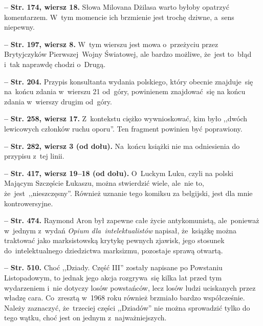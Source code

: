 \documentclass[a4paper,11pt]{article}  %
\newcommand{\spaceFour}{0.5em}
\newcommand{\tb}{\textbf}
\newcommand{\noi}{\noindent}
\newcommand{\start}{\noi \tb{--} {}}
\newcommand{\Str}[1]{\tb{Str. #1.}}
\newcommand{\StrWg}[2]{\tb{Str. #1, wiersz #2.}}
\newcommand{\StrWd}[2]{\tb{Str. #1, wiersz #2 (od dołu).}}
\begin{document}
\vspace{\spaceFour}


\start \StrWg{174}{18} Słowa Milovana Dżilasa warto byłoby opatrzyć
komentarzem. W~tym momencie ich brzmienie jest trochę dziwne, a~sens
niepewny.

\vspace{\spaceFour}


\start \StrWg{197}{8} W~tym wierszu jest mowa o~przeżyciu przez
Brytyjczyków Pierwszej~Wojny Światowej, ale bardzo możliwe, że~jest
to~błąd i~tak naprawdę chodzi o~Drugą.

\vspace{\spaceFour}


\start \Str{204} Przypis konsultanta wydania polskiego, który obecnie
znajduje~się na~końcu zdania w~wierszu 21 od~góry, powinienem
znajdować~się na końcu zdania w~wierszy drugim od~góry.

\vspace{\spaceFour}


\start \StrWg{258}{17} Z~kontekstu ciężko wywnioskować, kim było
,,dwóch lewicowych członków ruchu oporu''. Ten fragment powinien być
poprawiony.

\vspace{\spaceFour}


\start \StrWd{282}{3} Na~końcu książki nie ma odniesienia do przypisu
z~tej linii.

\vspace{\spaceFour}


\start \StrWd{417}{19--18} O~Luckym Luku, czyli na polski Mającym
Szczęście Łukaszu, można stwierdzić wiele, ale~nie to,
że~jest~,,nieszczęsny''. Również uznanie tego komiksu za belgijski,
jest dla mnie kontrowersyjne.

\vspace{\spaceFour}


\start \Str{474} Raymond Aron był zapewne całe życie antykomunistą,
ale~ponieważ w~jednym z~wydań \emph{Opium dla~intelektualistów}
napisał, że~książkę można traktować jako marksistowską krytykę pewnych
zjawisk, jego stosunek do~intelektualnego dziedzictwa marksizmu,
pozostaje sprawą otwartą.

\vspace{\spaceFour}


\start \Str{510} Choć ,,Dziady. Część III'' zostały napisane po
Powstaniu Listopadowym, to jednak jego akcja rozgrywa~się kilka lat
przed tym wydarzeniem i~nie dotyczy losów powstańców, lecz losów ludzi
uciskanych przez władzę cara. Co~zresztą w~1968 roku również brzmiało
bardzo współcześnie. Należy zaznaczyć, że~trzeciej części ,,Dziadów''
nie można sprowadzić tylko do tego wątku, choć jest on jednym
z~najważniejszych.
\end{document}

